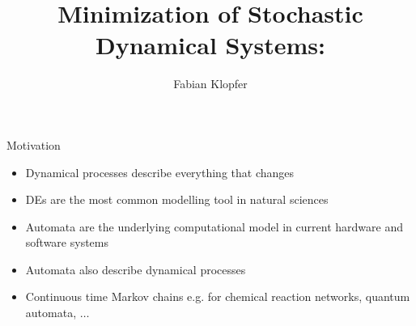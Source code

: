 \documentclass[rgb]{beamer}
\title{Minimization of Stochastic Dynamical Systems:}
\author{Fabian Klopfer}
\date{\thedate}
\institute{Modelling of Complex Self-Organizing Systems Group}
\begin{document}
    \begin{frame}
        \titlepage
    \end{frame}

    \begin{frame}{Motivation}
     \begin{itemize}
      \item Dynamical processes describe everything that changes
      \item DEs are the most common modelling tool in natural sciences
      \item Automata are the underlying computational model in current hardware and software systems
      \item Automata also describe dynamical processes
      \item Continuous time Markov chains e.g. for chemical reaction networks, quantum automata, $\dots$
     \end{itemize}
    \end{frame}
    
\end{document}
